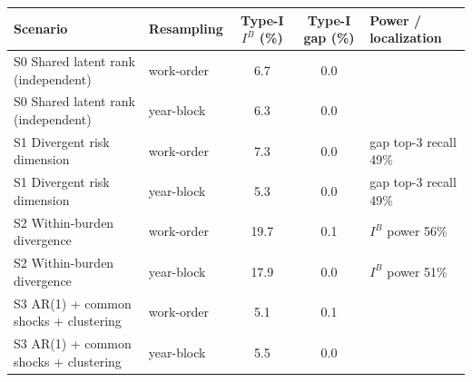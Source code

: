 \begin{tabular}{p{5.2cm}lccp{3.6cm}}
\toprule
Scenario & Resampling & Type-I $I^B$ (\%) & Type-I gap (\%) & Power / localization \\
\midrule
S0 Shared latent rank (independent) & work-order & 6.7 & 0.0 &  \\
S0 Shared latent rank (independent) & year-block & 6.3 & 0.0 &  \\
S1 Divergent risk dimension & work-order & 7.3 & 0.0 & gap top-3 recall 49\% \\
S1 Divergent risk dimension & year-block & 5.3 & 0.0 & gap top-3 recall 49\% \\
S2 Within-burden divergence & work-order & 19.7 & 0.1 & $I^B$ power 56\% \\
S2 Within-burden divergence & year-block & 17.9 & 0.0 & $I^B$ power 51\% \\
S3 AR(1) + common shocks + clustering & work-order & 5.1 & 0.1 &  \\
S3 AR(1) + common shocks + clustering & year-block & 5.5 & 0.0 &  \\
\bottomrule
\end{tabular}
